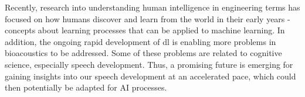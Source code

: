 Recently, research into understanding human intelligence in engineering terms has focused on how humans discover and learn from the world in their early years - concepts about learning processes that can be applied to machine learning.
In addition, the ongoing rapid development of \gls{dl} is enabling more problems in bioacoustics to be addressed.
Some of these problems are related to cognitive science, especially speech development.
Thus, a promising future is emerging for gaining insights into our speech development at an accelerated pace, which could then potentially be adapted for AI processes.
